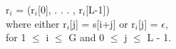 \documentclass[preview]{standalone}
\begin{document}
\begin{center}
r$_i$ = (r$_i$[0], . . . , r$_i$[L-1]) \\ where either r$_i$[j] = s[i+j] or r$_i$[j] = $\epsilon$,\\ for 1 $\le$ i $\le$ G and 0 $\le$  j $\le$ L - 1.
\end{center}
\end{document}

